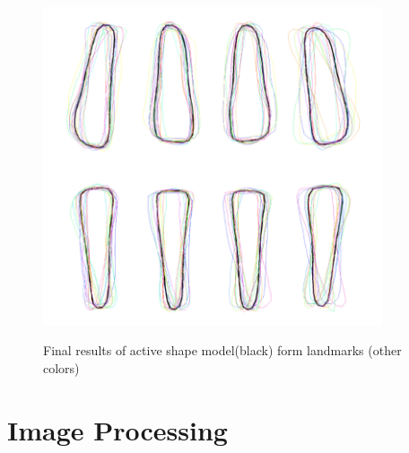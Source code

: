\documentclass[a4paper]{article}
\begin{document}
\begin{figure}[htp] 
    \centering
    \includegraphics[width=10cm]{activeshapemodel}
    \label{fig:bilateral}
    \caption{Final results of active shape model(black) form landmarks (other colors)}
\end{figure}

\section{Image Processing}\label{sec:preprocessing}
\end{document}
